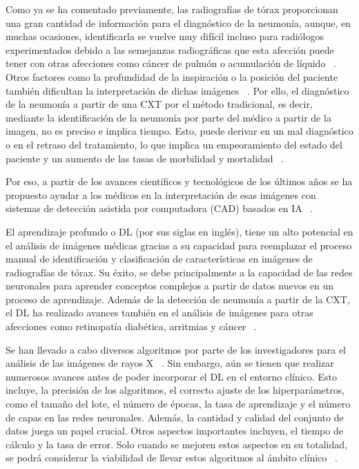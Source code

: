 Como ya se ha comentado previamente, las radiografías de tórax proporcionan una gran cantidad de información para el diagnóstico de la neumonía, aunque, en muchas ocasiones, identificarla se vuelve muy difícil incluso para radiólogos experimentados debido a las semejanzas radiográficas que esta afección puede tener con otras afecciones como cáncer de pulmón o acumulación de líquido ~\cite{li2020accuracy}. Otros factores como la profundidad de la inspiración o la posición del paciente también dificultan la interpretación de dichas imágenes ~\cite{jaiswal2019identifying}. Por ello, el diagnóstico de la neumonía a partir de una CXT por el método tradicional, es decir, mediante la identificación de la neumonía por parte del médico a partir de la imagen, no es preciso e implica tiempo. Esto, puede derivar en un mal diagnóstico o en el retraso del tratamiento, lo que implica un empeoramiento del estado del paciente y un aumento de las tasas de morbilidad y mortalidad ~\cite{li2020accuracy}.

Por eso, a partir de los avances científicos y tecnológicos de los últimos años se ha propuesto ayudar a los médicos en la interpretación de esas imágenes con sistemas de detección asistida por computadora (CAD) basados en IA ~\cite{li2020accuracy}.

El aprendizaje profundo o DL (por sus siglas en inglés), tiene un alto potencial en el análisis de imágenes médicas gracias a su capacidad para reemplazar el proceso manual de identificación y clasificación de características en imágenes de radiografías de tórax. Su éxito, se debe principalmente a la capacidad de las redes neuronales para aprender conceptos complejos a partir de datos nuevos en un proceso de aprendizaje. Además de la detección de neumonía a partir de la CXT, el DL ha realizado avances también en el análisis de imágenes para otras afecciones como retinopatía diabética, arritmias y cáncer ~\cite{li2020accuracy}.

Se han llevado a cabo diversos algoritmos por parte de los investigadores para el análisis de las imágenes de rayos X ~\cite{jaiswal2019identifying}. Sin embargo, aún se tienen que realizar numerosos avances antes de poder incorporar el DL en el entorno clínico. Esto incluye, la precisión de los algoritmos, el correcto ajuste de los hiperparámetros, como el tamaño del lote, el número de épocas, la tasa de aprendizaje y el número de capas en las redes neuronales. Además, la cantidad y calidad del conjunto de datos juega un papel crucial. Otros aspectos importantes incluyen, el tiempo de cálculo y la tasa de error. Solo cuando se mejoren estos aspectos en su totalidad, se podrá considerar la viabilidad de llevar estos algoritmos al ámbito clínico ~\cite{jaiswal2019identifying, sharma2024systematic}.

